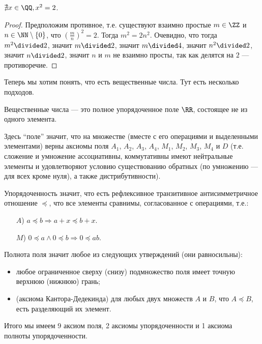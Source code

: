 \documentclass[12pt,a4paper]{article}
\begin{document}
    \begin{theorem}
        $\nexists x\in \QQ, x^2 = 2$.
    \end{theorem}

    \begin{proof}
        Предположим противное, т.е. существуют взаимно простые $m \in \ZZ$ и $n \in \NN\setminus\{0\}$, что $(\frac{m}{n})^2 = 2$. Тогда $m^2 = 2n^2$. Очевидно, что тогда $m^2 \divided 2$, значит $m\divided 2$, значит $m\divided 4$, значит $n^2 \divided 2$, значит $n \divided 2$, значит $n$ и $m$ не взаимно просты, так как делятся на $2$ --- противоречие.
    \end{proof}

    Теперь мы хотим понять, что есть вещественные числа. Тут есть несколько подходов.

    \begin{definition}
        Вещественные числа --- это полное упорядоченное поле $\RR$, состоящее не из одного элемента.
        
        Здесь ``поле'' значит, что на множестве (вместе с его операциями и выделенными элементами) верны аксиомы поля $A_1$, $A_2$, $A_3$, $A_4$, $M_1$, $M_2$, $M_3$, $M_4$ и $D$ (т.е. сложение и умножение ассоциативны, коммутативны имеют нейтральные элементы и удовлетворяют условию существованию обратных (по умножению --- для всех кроме нуля), а также дистрибутивности).
        
        Упорядоченность значит, что есть рефлексивное транзитивное антисимметричное отношение $\preccurlyeq$, что все элементы сравнимы, согласованное с операциями, т.е.:
        \begin{itemize}
            \item[$A$)] $a \preccurlyeq b \Rightarrow a + x \preccurlyeq b + x$.
            \item[$M$)] $0 \preccurlyeq a \wedge 0 \preccurlyeq b \Rightarrow 0 \preccurlyeq ab$.
        \end{itemize}

        Полнота поля значит любое из следующих утверждений (они равносильны):
        \begin{itemize}
            \item любое ограниченное сверху (снизу) подмножество поля имеет точную верхнюю (нижнюю) грань;
            \item (аксиома Кантора-Дедекинда) для любых двух множеств $A$ и $B$, что $A \preccurlyeq B$, есть разделяющий их элемент.
        \end{itemize}

        Итого мы имеем 9 аксиом поля, 2 аксиомы упорядоченности и 1 аксиома полноты упорядоченности.
    \end{definition}
\end{document}

